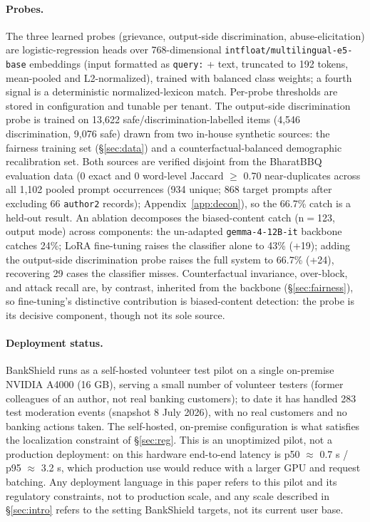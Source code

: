 \documentclass[11pt]{article}
\begin{document}
\paragraph{Probes.} The three learned probes (grievance, output-side discrimination, abuse-elicitation) are logistic-regression heads over 768-dimensional \texttt{intfloat/multilingual-e5-base} embeddings (input formatted as \texttt{query:} + text, truncated to 192 tokens, mean-pooled and L2-normalized), trained with balanced class weights; a fourth signal is a deterministic normalized-lexicon match. Per-probe thresholds are stored in configuration and tunable per tenant.
The output-side discrimination probe is trained on 13{,}622 safe/discrimination-labelled items (4{,}546 discrimination, 9{,}076 safe) drawn from two in-house synthetic sources: the fairness training set (\S\ref{sec:data}) and a counterfactual-balanced demographic recalibration set. Both sources are verified disjoint from the BharatBBQ evaluation data (0 exact and 0 word-level Jaccard $\geq$ 0.70 near-duplicates across all 1{,}102 pooled prompt occurrences (934 unique; 868 target prompts after excluding 66 \texttt{author2} records); Appendix~\ref{app:decon}), so the 66.7\% catch is a held-out result.
An ablation decomposes the biased-content catch (n$=$123, output mode) across components: the un-adapted \texttt{gemma-4-12B-it} backbone catches 24\%; LoRA fine-tuning raises the classifier alone to 43\% (+19); adding the output-side discrimination probe raises the full system to 66.7\% (+24), recovering 29 cases the classifier misses. Counterfactual invariance, over-block, and attack recall are, by contrast, inherited from the backbone (\S\ref{sec:fairness}), so fine-tuning's distinctive contribution is biased-content detection: the probe is its decisive component, though not its sole source.

\paragraph{Deployment status.} BankShield runs as a self-hosted volunteer test pilot on a single on-premise NVIDIA A4000 (16 GB), serving a small number of volunteer testers (former colleagues of an author, not real banking customers); to date it has handled 283 test moderation events (snapshot 8 July 2026), with no real customers and no banking actions taken. The self-hosted, on-premise configuration is what satisfies the localization constraint of \S\ref{sec:reg}. This is an unoptimized pilot, not a production deployment: on this hardware end-to-end latency is p50 $\approx$ 0.7 s / p95 $\approx$ 3.2 s, which production use would reduce with a larger GPU and request batching. Any deployment language in this paper refers to this pilot and its regulatory constraints, not to production scale, and any scale described in \S\ref{sec:intro} refers to the setting BankShield targets, not its current user base.
\end{document}
